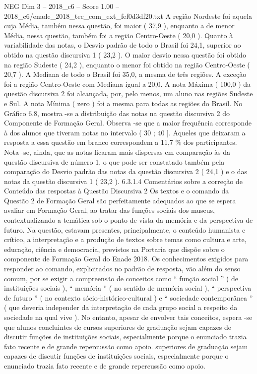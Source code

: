 \begin{textsample}{NEG Dim 3 – 2018\_c6 – Score 1.00 – 2018\_c6/enade\_2018\_tec\_com\_ext\_fef0d3df20.txt}
A região Nordeste foi aquela cuja Média, também nessa questão, foi maior ( 37,9 ), enquanto a de menor Média, nessa questão, também foi a região Centro-Oeste ( 20,0 ).
Quanto à variabilidade das notas, o Desvio padrão de todo o Brasil foi 24,1, superior ao obtido na questão discursiva 1 ( 23,2 ).
O maior desvio nessa questão foi obtido na região Sudeste ( 24,2 ), enquanto o menor foi obtido na região Centro-Oeste ( 20,7 ).
A Mediana de todo o Brasil foi 35,0, a mesma de três regiões.
A exceção foi a região Centro-Oeste com Mediana igual a 20,0.
A nota Máxima ( 100,0 ) da questão discursiva 2 foi alcançada, por, pelo menos, um aluno nas regiões Sudeste e Sul.
A nota Mínima ( zero ) foi a mesma para todas as regiões do Brasil.
No Gráfico 6.8, mostra -se a distribuição das notas na questão discursiva 2 do Componente de Formação Geral.
Observa -se que a maior frequência corresponde à dos alunos que tiveram notas no intervalo ( 30 ; 40 ].
Aqueles que deixaram a resposta a essa questão em branco correspondem a 11,7 \% dos participantes.
Nota -se, ainda, que as notas ficaram mais dispersas em comparação às da questão discursiva de número 1, o que pode ser constatado também pela comparação do Desvio padrão das notas da questão discursiva 2 ( 24,1 ) e o das notas da questão discursiva 1 ( 23,2 ). 6.3.1.4 Comentários sobre a correção de Conteúdo das respostas à Questão Discursiva 2 Os textos e o comando da Questão 2 de Formação Geral são perfeitamente adequados ao que se espera avaliar em Formação Geral, ao tratar das funções sociais dos museus, contextualizando a temática sob o ponto de vista da memória e da perspectiva de futuro.
Na questão, estavam presentes, principalmente, o conteúdo humanista e crítico, a interpretação e a produção de textos sobre temas como cultura e arte, educação, ciência e democracia, previstos na Portaria que dispõe sobre o componente de Formação Geral do Enade 2018.
Os conhecimentos exigidos para responder ao comando, explicitados no padrão de resposta, vão além do senso comum, por se exigir a compreensão de conceitos como “ função social ” ( de instituições sociais ), “ memória ” ( no sentido de memória social ), “ perspectiva de futuro ” ( no contexto sócio-histórico-cultural ) e “ sociedade contemporânea ” ( que deveria independer da interpretação de cada grupo social a respeito da sociedade na qual vive ).
No entanto, apesar de envolver tais conceitos, espera -se que alunos concluintes de cursos superiores de graduação sejam capazes de discutir funções de instituições sociais, especialmente porque o enunciado trazia fato recente e de grande repercussão como apoio. superiores de graduação sejam capazes de discutir funções de instituições sociais, especialmente porque o enunciado trazia fato recente e de grande repercussão como apoio.

\end{textsample}
